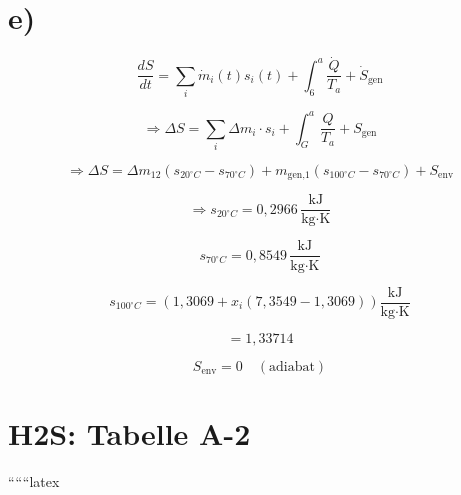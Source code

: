 

\section*{e)}

\begin{equation*}
\frac{dS}{dt} = \sum_{i} \dot{m}_{i}(t) s_{i}(t) + \int_{6}^{a} \frac{\dot{Q}}{T_{a}} + \dot{S}_{\text{gen}}
\end{equation*}

\begin{equation*}
\Rightarrow \Delta S = \sum_{i} \Delta m_{i} \cdot s_{i} + \int_{G}^{a} \frac{Q}{T_{a}} + S_{\text{gen}}
\end{equation*}

\begin{equation*}
\Rightarrow \Delta S = \Delta m_{12} \left( s_{20^{\circ}C} - s_{70^{\circ}C} \right) + m_{\text{gen,1}} \left( s_{100^{\circ}C} - s_{70^{\circ}C} \right) + S_{\text{env}}
\end{equation*}

\begin{equation*}
\Rightarrow s_{20^{\circ}C} = 0,2966 \, \frac{\text{kJ}}{\text{kg} \cdot \text{K}}
\end{equation*}

\begin{equation*}
s_{70^{\circ}C} = 0,8549 \, \frac{\text{kJ}}{\text{kg} \cdot \text{K}}
\end{equation*}

\begin{equation*}
s_{100^{\circ}C} = \left( 1,3069 + x_{i} \left( 7,3549 - 1,3069 \right) \right) \frac{\text{kJ}}{\text{kg} \cdot \text{K}}
\end{equation*}

\begin{equation*}
= 1,33714
\end{equation*}

\begin{equation*}
S_{\text{env}} = 0 \quad (\text{adiabat})
\end{equation*}

\section*{H2S: Tabelle A-2}

``````latex